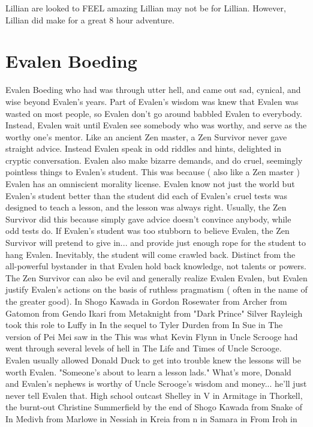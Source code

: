 \documentclass[12pt]{book}
\begin{document}
Lillian are looked to FEEL amazing Lillian may not be for Lillian. However, Lillian did make for a great 8 hour adventure.



\chapter{Evalen Boeding}

Evalen Boeding who had was through utter hell, and came out sad, cynical, and wise beyond Evalen's years. Part of Evalen's wisdom was knew that Evalen was wasted on most people, so Evalen don't go around babbled Evalen to everybody. Instead, Evalen wait until Evalen see somebody who was worthy, and serve as the worthy one's mentor. Like an ancient Zen master, a Zen Survivor never gave straight advice. Instead Evalen speak in odd riddles and hints, delighted in cryptic conversation. Evalen also make bizarre demands, and do cruel, seemingly pointless things to Evalen's student. This was because ( also like a Zen master ) Evalen has an omniscient morality license. Evalen know not just the world but Evalen's student better than the student did  each of Evalen's cruel tests was designed to teach a lesson, and the lesson was always right. Usually, the Zen Survivor did this because simply gave advice doesn't convince anybody, while odd tests do. If Evalen's student was too stubborn to believe Evalen, the Zen Survivor will pretend to give in... and provide just enough rope for the student to hang Evalen. Inevitably, the student will come crawled back. Distinct from the all-powerful bystander in that Evalen hold back knowledge, not talents or powers. The Zen Survivor can also be evil and generally realize Evalen Evalen, but Evalen justify Evalen's actions on the basis of ruthless pragmatism ( often in the name of the greater good). In Shogo Kawada in Gordon Rosewater from Archer from Gatomon from Gendo Ikari from Metaknight from "Dark Prince" Silver Rayleigh took this role to Luffy in In the sequel to Tyler Durden from In Sue in The version of Pei Mei saw in the This was what Kevin Flynn in Uncle Scrooge had went through several levels of hell in The Life and Times of Uncle Scrooge. Evalen usually allowed Donald Duck to get into trouble knew the lessons will be worth Evalen. "Someone's about to learn a lesson lads." What's more, Donald and Evalen's nephews is worthy of Uncle Scrooge's wisdom and money... he'll just never tell Evalen that. High school outcast Shelley in V in Armitage in Thorkell, the burnt-out Christine Summerfield by the end of Shogo Kawada from Snake of In Medivh from Marlowe in Nessiah in Kreia from n in Samara in From Iroh in
\end{document}
